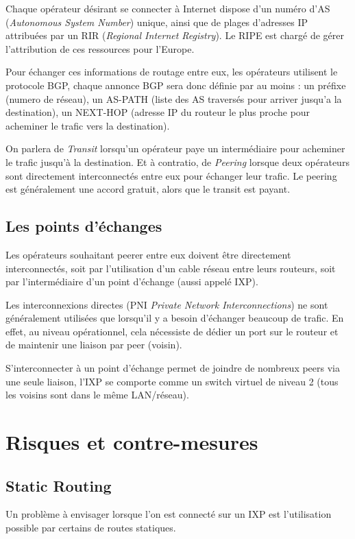 Chaque opérateur désirant se connecter à Internet dispose d'un numéro d'AS (\emph{Autonomous System Number}) unique, ainsi que de plages d'adresses IP attribuées par un RIR (\emph{Regional Internet Registry}). Le RIPE est chargé de gérer l'attribution de ces ressources pour l'Europe.

Pour échanger ces informations de routage entre eux, les opérateurs utilisent le protocole BGP, chaque annonce BGP sera donc définie par au moins : un préfixe (numero de réseau), un AS-PATH (liste des AS traversés pour arriver jusqu'a la destination), un NEXT-HOP (adresse IP du routeur le plus proche pour acheminer le trafic vers la destination).

On parlera de \emph{Transit} lorsqu'un opérateur paye un intermédiaire pour acheminer le trafic jusqu'à la destination.
Et à contratio, de \emph{Peering} lorsque deux opérateurs sont directement interconnectés entre eux pour échanger leur trafic. Le peering est généralement une accord gratuit, alors que le transit est payant.

\subsection{Les points d'échanges}
Les opérateurs souhaitant peerer entre eux doivent être directement interconnectés, soit par l'utilisation d'un cable réseau entre leurs routeurs, soit par l'intermédiaire d'un point d'échange (aussi appelé IXP).

Les interconnexions directes (PNI \emph{Private Network Interconnections}) ne sont généralement utilisées que lorsqu'il y a besoin d'échanger beaucoup de trafic. En effet, au niveau opérationnel, cela nécessiste de dédier un port sur le routeur et de maintenir une liaison par peer (voisin).

S'interconnecter à un point d'échange permet de joindre de nombreux peers via une seule liaison, l'IXP se comporte comme un switch virtuel de niveau 2 (tous les voisins sont dans le même LAN/réseau).



\section{Risques et contre-mesures}

\subsection{Static Routing}
Un problème à envisager lorsque l'on est connecté sur un IXP est l’utilisation possible par certains de routes statiques. 


